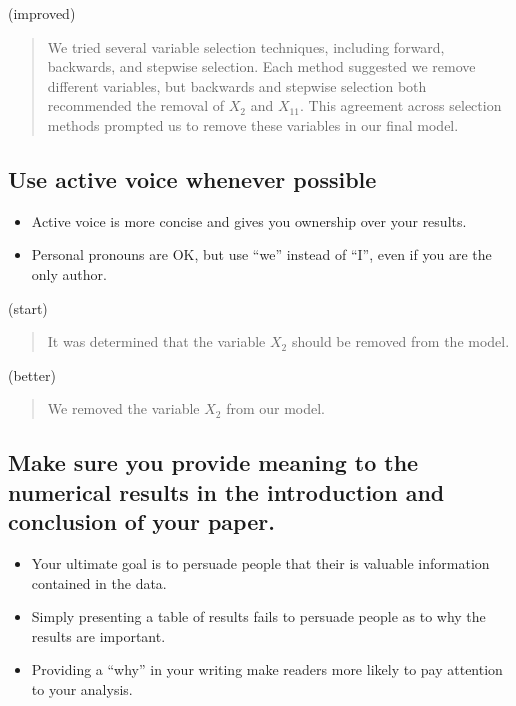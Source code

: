 \documentclass[12pt]{notes}
\begin{document}
(improved)
\begin{quote}
We tried several variable selection techniques, including forward, backwards, and stepwise selection. Each method suggested we remove different variables, but backwards and stepwise selection both recommended the removal of $X_2$ and $X_{11}$. This agreement across selection methods prompted us to remove these variables in our final model. 
\end{quote}

\subsection*{Use active voice whenever possible}
\begin{itemize}
\item Active voice is more concise and gives you ownership over your results. 
\item Personal pronouns are OK, but use ``we'' instead of ``I'', even if you are the only author. 
\end{itemize}

(start)
\begin{quote}
It was determined that the variable $X_2$ should be removed from the model. 
\end{quote}

(better)
\begin{quote}
We removed the variable $X_2$ from our model. 
\end{quote}

\subsection*{Make sure you provide meaning to the numerical results in the introduction and conclusion of your paper.}
\begin{itemize}
\item Your ultimate goal is to persuade people that their is valuable information contained in the data. 
\item Simply presenting a table of results fails to persuade people as to why the results are important. 
\item Providing a ``why'' in your writing make readers more likely to pay attention to your analysis. 
\end{itemize}
\end{document}
